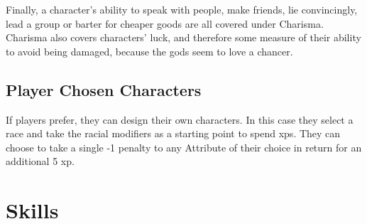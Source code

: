 \begin{multicols}{2}
Finally, a character's ability to speak with people, make friends, lie convincingly, lead a group or barter for cheaper goods are all covered under Charisma. Charisma also covers characters' luck, and therefore some measure of their ability to avoid being damaged, because the gods seem to love a chancer.

\subsection{Player Chosen Characters}
\label{playerchosen}

If players prefer, they can design their own characters. In this case they select a race and take the racial modifiers as a starting point to spend \glspl{xp}.  They can choose to take a single -1 penalty to any Attribute of their choice in return for an additional 5 \gls{xp}.

\end{multicols}

\section{Skills}


